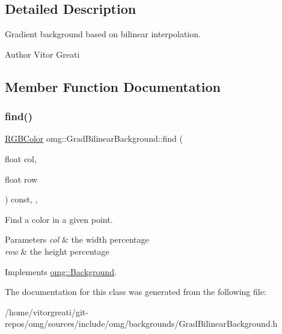 \subsection{Detailed Description}
Gradient background based on bilinear interpolation. 

\begin{DoxyAuthor}{Author}
Vitor Greati 
\end{DoxyAuthor}


\subsection{Member Function Documentation}
\mbox{\label{classomg_1_1_grad_bilinear_background_a074c489f7e8514420bd1e1f362202b03}} 
\subsubsection{\texorpdfstring{find()}{find()}}
{\footnotesize\ttfamily \mbox{\hyperlink{namespaceomg_a7b0e3f3dcf76f2b4758c314a41885917}{R\+G\+B\+Color}} omg\+::\+Grad\+Bilinear\+Background\+::find (\begin{DoxyParamCaption}\item[{float}]{col,  }\item[{float}]{row }\end{DoxyParamCaption}) const\hspace{0.3cm}{\ttfamily [inline]}, {\ttfamily [override]}, {\ttfamily [virtual]}}



Find a color in a given point. 


\begin{DoxyParams}{Parameters}
{\em col} & the width percentage \\
\hline
{\em row} & the height percentage \\
\hline
\end{DoxyParams}


Implements \mbox{\hyperlink{classomg_1_1_background_a9f98d6bc2e213de258b5c3e45040b462}{omg\+::\+Background}}.



The documentation for this class was generated from the following file\+:\begin{DoxyCompactItemize}
\item 
/home/vitorgreati/git-\/repos/omg/sources/include/omg/backgrounds/Grad\+Bilinear\+Background.\+h\end{DoxyCompactItemize}
